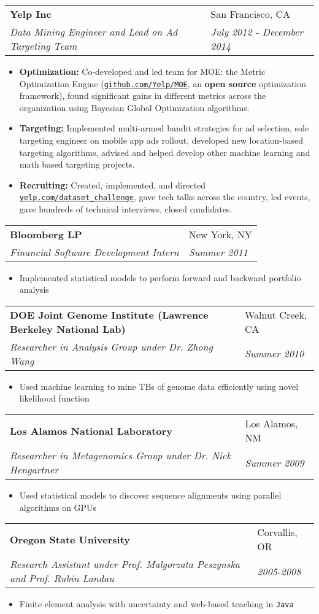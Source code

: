 \documentclass[letterpaper, 11pt]{article}
\makeatletter
\newcommand{\entry}[4]{%
  \begin{tabularx}{\linewidth}{@{}Xl@{}}
    \textbf{#1} & #2          \\
    \textit{#3} & \textit{#4} \\
  \end{tabularx}
}
\newcommand{\website}[1]{\href{http://#1}{\texttt{#1}}}
\makeatother
\begin{document}
  \entry{Yelp Inc}{San Francisco, CA}{Data Mining Engineer and Lead on Ad Targeting Team}{July 2012 - December 2014}
  \begin{itemize}
    \item{{\bf Optimization:} Co-developed and led team for MOE: the Metric Optimization Engine (\website{github.com/Yelp/MOE}, an \textbf{open source} optimization framework), found significant gains in different metrics across the organization using Bayesian Global Optimization algorithms.}
    \item{{\bf Targeting:} Implemented multi-armed bandit strategies for ad selection, sole targeting engineer on mobile app ads rollout, developed new location-based targeting algorithms, advised and helped develop other machine learning and math based targeting projects.}
    \item{{\bf Recruiting:} Created, implemented, and directed \website{yelp.com/dataset\_challenge}, gave tech talks across the country, led events, gave hundreds of technical interviews, closed candidates.}
  \end{itemize}

  \entry{Bloomberg LP}{New York, NY}{Financial Software Development Intern}{Summer 2011}
  \begin{itemize}
    \item{Implemented statistical models to perform forward and backward portfolio analysis}
  \end{itemize}

  \entry{DOE Joint Genome Institute (Lawrence Berkeley National Lab)}{Walnut Creek, CA}{Researcher in Analysis Group under Dr. Zhong Wang}{Summer 2010}
  \begin{itemize}
    \item{Used machine learning to mine TBs of genome data efficiently using novel likelihood function}
  \end{itemize}

  \entry{Los Alamos National Laboratory}{Los Alamos, NM}{Researcher in Metagenomics Group under Dr. Nick Hengartner}{Summer 2009}
  \begin{itemize}
    \item{Used statistical models to discover sequence alignments using parallel algorithms on GPUs}
  \end{itemize}

  \entry{Oregon State University}{Corvallis, OR}{Research Assistant under Prof. Malgorzata Peszynska and Prof. Rubin Landau}{2005-2008}
  \begin{itemize}
    \item{Finite element analysis with uncertainty and web-based teaching in \texttt{Java}}
  \end{itemize}
\end{document}
